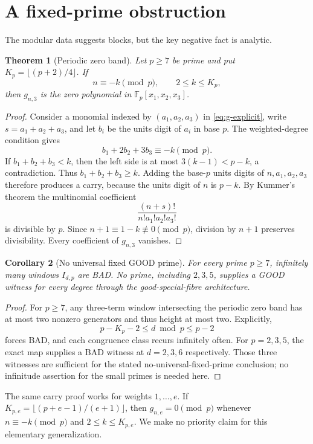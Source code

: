 \documentclass[11pt]{article}
\newtheorem{theorem}{Theorem}[section]
\newtheorem{corollary}[theorem]{Corollary}
\theoremstyle{definition}
\newcommand{\FF}{\mathbb{F}}
\begin{document}
\section{A fixed-prime obstruction}

The modular data suggests blocks, but the key negative fact is analytic.

\begin{theorem}[Periodic zero band]\label{thm:zeroband}
Let $p\ge7$ be prime and put $K_p=\lfloor(p+2)/4\rfloor$.  If
\[
 n\equiv-k\pmod p,\qquad 2\le k\le K_p,
\]
then $g_{n,3}$ is the zero polynomial in
$\FF_p[x_1,x_2,x_3]$.
\end{theorem}

\begin{proof}
Consider a monomial indexed by $(a_1,a_2,a_3)$ in
\eqref{eq:g-explicit}, write $s=a_1+a_2+a_3$, and let $b_i$ be the units
digit of $a_i$ in base $p$.  The weighted-degree condition gives
\[
 b_1+2b_2+3b_3\equiv-k\pmod p.
\]
If $b_1+b_2+b_3<k$, then the left side is at most $3(k-1)<p-k$, a
contradiction.  Thus $b_1+b_2+b_3\ge k$.  Adding the base-$p$ units digits
of $n,a_1,a_2,a_3$ therefore produces a carry, because the units digit of
$n$ is $p-k$.  By Kummer's theorem the multinomial coefficient
\[
 \frac{(n+s)!}{n!a_1!a_2!a_3!}
\]
is divisible by $p$.  Since $n+1\equiv1-k\not\equiv0\pmod p$, division by
$n+1$ preserves divisibility.  Every coefficient of $g_{n,3}$ vanishes.
\end{proof}

\begin{corollary}[No universal fixed GOOD prime]\label{cor:nofixedprime}
For every prime $p\ge7$, infinitely many windows $I_{d,p}$ are BAD.  No
prime, including $2,3,5$, supplies a GOOD witness for every degree through
the good-special-fibre architecture.
\end{corollary}

\begin{proof}
For $p\ge7$, any three-term window intersecting the periodic zero band has at
most two nonzero generators and thus height at most two.  Explicitly,
\[
 p-K_p-2\le d\bmod p\le p-2
\]
forces BAD, and each congruence class recurs infinitely often.  For
$p=2,3,5$, the exact map supplies a BAD witness at $d=2,3,6$ respectively.
Those three witnesses are sufficient for the stated no-universal-fixed-prime
conclusion; no infinitude assertion for the small primes is needed here.
\end{proof}

The same carry proof works for weights $1,\ldots,e$.  If
$K_{p,e}=\lfloor(p+e-1)/(e+1)\rfloor$, then
$g_{n,e}=0\pmod p$ whenever $n\equiv-k\pmod p$ and
$2\le k\le K_{p,e}$.  We make no priority claim for this elementary
generalization.
\end{document}

